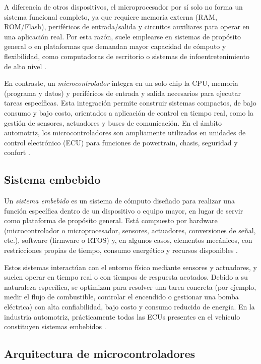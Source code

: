 A diferencia de otros dispositivos, el microprocesador por sí solo no forma un sistema funcional completo, ya que requiere memoria externa (RAM, ROM/Flash), periféricos de entrada/salida y circuitos auxiliares para operar en una aplicación real. Por esta razón, suele emplearse en sistemas de propósito general o en plataformas que demandan mayor capacidad de cómputo y flexibilidad, como computadoras de escritorio o sistemas de infoentretenimiento de alto nivel \citep{ MikroE2018}.

En contraste, un \textit{microcontrolador} integra en un solo chip la CPU, memoria (programa y datos) y periféricos de entrada y salida necesarios para ejecutar tareas específicas. Esta integración permite construir sistemas compactos, de bajo consumo y bajo costo, orientados a aplicación de control en tiempo real, como la gestión de sensores, actuadores y buses de comunicación. En el ámbito automotriz, los microcontroladores son ampliamente utilizados en unidades de control electrónico (ECU) para funciones de powertrain, chasis, seguridad y confort \citep{ EmbebidosUruguay}.

\subsection{Sistema embebido}
Un \textit{sistema embebido} es un sistema de cómputo diseñado para realizar una función específica dentro de un dispositivo o equipo mayor, en lugar de servir como plataforma de propósito general. Está compuesto por hardware (microcontrolador o microprocesador, sensores, actuadores, conversiones de señal, etc.), software (firmware o RTOS) y, en algunos casos, elementos mecánicos, con restricciones propias de tiempo, consumo energético y recursos disponibles \citep{EmbebidosUruguay, ITESOEmbebidos}.

Estos sistemas interactúan con el entorno físico mediante sensores y actuadores, y suelen operar en tiempo real o con tiempos de respuesta acotados. Debido a su naturaleza específica, se optimizan para resolver una tarea concreta (por ejemplo, medir el flujo de combustible, controlar el encendido o gestionar una bomba eléctrica) con alta confiabilidad, bajo costo y consumo reducido de energía. En la industria automotriz, prácticamente todas las ECUs presentes en el vehículo constituyen sistemas embebidos \citep{EmbebidosUruguay, AutomotiveEmbeddedHandbook}.

\subsection{Arquitectura de microcontroladores}

